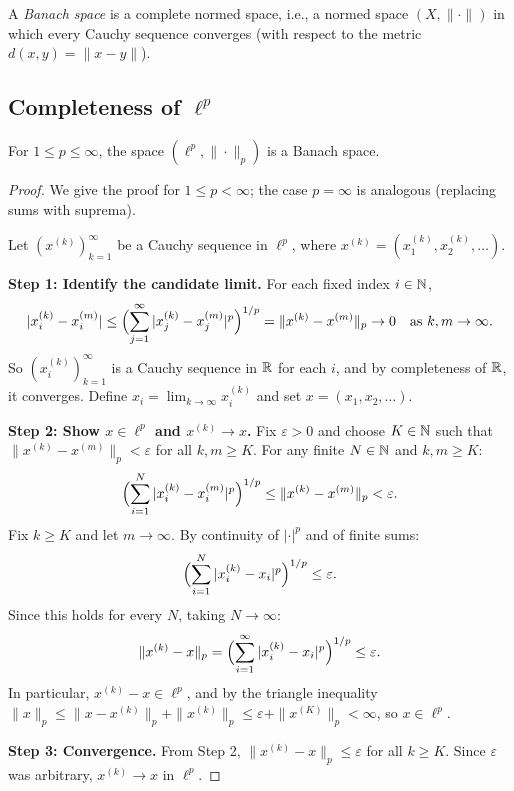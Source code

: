 \documentclass[11pt,a4paper]{article}
\begin{document}
\begin{definition}
\label{def:banach}
A \emph{Banach space} is a complete normed space, i.e., a normed space
$(X, \|\cdot\|)$ in which every Cauchy sequence converges (with respect to
the metric $d(x,y) = \|x - y\|$).
\end{definition}

\subsection{Completeness of $\ell^p$}

\begin{theorem}
\label{thm:ell_p_banach}
For $1 \le p \le \infty$, the space $(\ell^p, \|\cdot\|_p)$ is a Banach
space.
\end{theorem}

\begin{proof}
We give the proof for $1 \le p < \infty$; the case $p = \infty$ is
analogous (replacing sums with suprema).

Let $(x^{(k)})_{k=1}^\infty$ be a Cauchy sequence in $\ell^p$, where
$x^{(k)} = (x_1^{(k)}, x_2^{(k)}, \ldots)$.

\textbf{Step 1: Identify the candidate limit.}
For each fixed index $i \in \mathbb{N}$,
\[
|x_i^{(k)} - x_i^{(m)}| \le
\Bigl(\sum_{j=1}^\infty |x_j^{(k)} - x_j^{(m)}|^p\Bigr)^{1/p}
= \|x^{(k)} - x^{(m)}\|_p \to 0
\quad \text{as } k, m \to \infty.
\]
So $(x_i^{(k)})_{k=1}^\infty$ is a Cauchy sequence in $\mathbb{R}$ for each $i$, and
by completeness of $\mathbb{R}$, it converges. Define $x_i = \lim_{k \to \infty}
x_i^{(k)}$ and set $x = (x_1, x_2, \ldots)$.

\textbf{Step 2: Show $x \in \ell^p$ and $x^{(k)} \to x$.}
Fix $\varepsilon > 0$ and choose $K \in \mathbb{N}$ such that
$\|x^{(k)} - x^{(m)}\|_p < \varepsilon$ for all $k, m \ge K$. For any
finite $N \in \mathbb{N}$ and $k, m \ge K$:
\[
\Bigl(\sum_{i=1}^N |x_i^{(k)} - x_i^{(m)}|^p\Bigr)^{1/p}
\le \|x^{(k)} - x^{(m)}\|_p < \varepsilon.
\]
Fix $k \ge K$ and let $m \to \infty$. By continuity of $|\cdot|^p$ and of
finite sums:
\[
\Bigl(\sum_{i=1}^N |x_i^{(k)} - x_i|^p\Bigr)^{1/p} \le \varepsilon.
\]
Since this holds for every $N$, taking $N \to \infty$:
\[
\|x^{(k)} - x\|_p = \Bigl(\sum_{i=1}^\infty |x_i^{(k)} - x_i|^p
\Bigr)^{1/p} \le \varepsilon.
\]
In particular, $x^{(k)} - x \in \ell^p$, and by the triangle inequality
$\|x\|_p \le \|x - x^{(k)}\|_p + \|x^{(k)}\|_p \le \varepsilon +
\|x^{(K)}\|_p < \infty$, so $x \in \ell^p$.

\textbf{Step 3: Convergence.} From Step 2,
$\|x^{(k)} - x\|_p \le \varepsilon$ for all $k \ge K$. Since $\varepsilon$
was arbitrary, $x^{(k)} \to x$ in $\ell^p$.
\end{proof}
\end{document}
